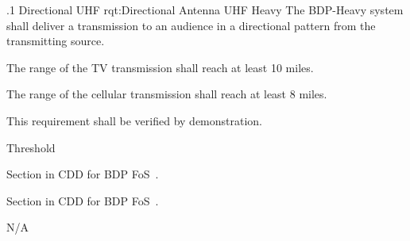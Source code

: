 
\NRQMTT
{\RqtNumberBase.1}
{Directional UHF}
{rqt:Directional Antenna UHF Heavy}
{The BDP-Heavy system shall deliver a \UHF transmission to an audience in a directional pattern from the transmitting source.}%
{
	\item The range of the \UHF TV transmission shall reach at least 10 miles.
	\item The range of the \UHF cellular transmission shall reach at least 8 miles.
}
{This requirement shall be verified by demonstration.}
{
	\item [Phase 1] Threshold
}
{
\item [5.1.2] Section in CDD for BDP FoS~\cite{ref__BDP_FOS_CDD}.
\item [5.1.3] Section in CDD for BDP FoS~\cite{ref__BDP_FOS_CDD}.
} 
{
	\item N/A
}

